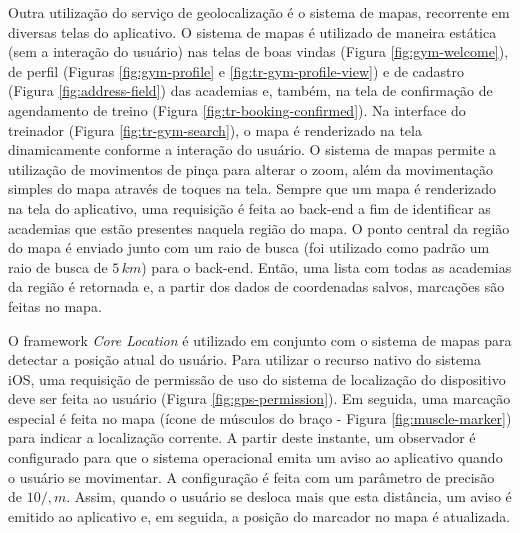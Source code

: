 Outra utilização do serviço de geolocalização é o sistema de mapas, recorrente em diversas telas do aplicativo. O sistema de mapas é utilizado de maneira estática (sem a interação do usuário) nas telas de boas vindas (Figura \ref{fig:gym-welcome}), de perfil (Figuras \ref{fig:gym-profile} e \ref{fig:tr-gym-profile-view}) e de cadastro (Figura \ref{fig:address-field}) das academias e, também, na tela de confirmação de agendamento de treino (Figura \ref{fig:tr-booking-confirmed}). Na interface do treinador (Figura \ref{fig:tr-gym-search}), o mapa é renderizado na tela dinamicamente conforme a interação do usuário. O sistema de mapas permite a utilização de movimentos de pinça para alterar o zoom, além da movimentação simples do mapa através de toques na tela. Sempre que um mapa é renderizado na tela do aplicativo, uma requisição é feita ao back-end a fim de identificar as academias que estão presentes naquela região do mapa. O ponto central da região do mapa é enviado junto com um raio de busca (foi utilizado como padrão um raio de busca de $5\,km$) para o back-end. Então, uma lista com todas as academias da região é retornada e, a partir dos dados de coordenadas salvos, marcações são feitas no mapa.
                               
O framework \textit{Core Location} é utilizado em conjunto com o sistema de mapas para detectar a posição atual do usuário. Para utilizar o recurso nativo do sistema iOS, uma requisição de permissão de uso do sistema de localização do dispositivo deve ser feita ao usuário (Figura \ref{fig:gps-permission}). Em seguida, uma marcação especial é feita no mapa (ícone de músculos do braço - Figura \ref{fig:muscle-marker}) para indicar a localização corrente. A partir deste instante, um observador é configurado para que o sistema operacional emita um aviso ao aplicativo quando o usuário se movimentar. A configuração é feita com um parâmetro de precisão de $10/,m$. Assim, quando o usuário se desloca mais que esta distância, um aviso é emitido ao aplicativo e, em seguida, a posição do marcador no mapa é atualizada.

